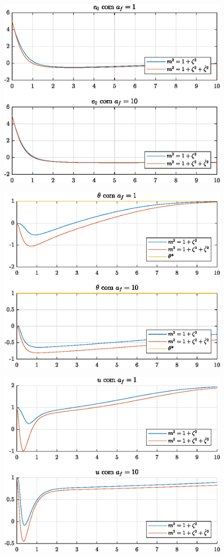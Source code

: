 \begin{figure}[H]
  \centering
  \includegraphics[width=12cm]{figs/e0/af1af10.eps}
\end{figure}

\begin{figure}[H]
  \centering
  \includegraphics[width=12cm]{figs/theta/af1af10.eps} 
\end{figure}

\begin{figure}[H]
  \centering
  \includegraphics[width=12cm]{figs/u/af1af10.eps} 
\end{figure}

